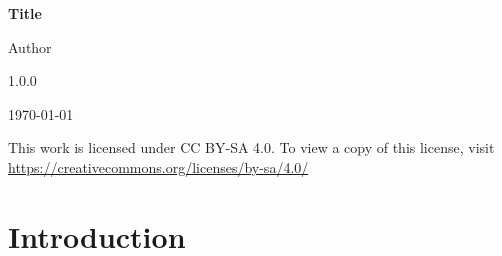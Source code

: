 \documentclass[12pt]{article}
\newcommand{\Title}{Title}
\newcommand{\Author}{Author}
\newcommand{\Version}{1.0.0}
\newcommand{\License}{This work is licensed under CC BY-SA 4.0. To view a copy of this license, visit \url{https://creativecommons.org/licenses/by-sa/4.0/}}
\begin{document}
\begin{titlepage}
    \centering
    \vspace*{2cm}

    {\Huge\bfseries \Title\par}
    \vspace{1.5cm}

    {\Large \Author\par}
    \vfill

    {\large \Version\par}
    {\large \today\par}
    \vspace{1cm}

    {\small \License\par}
\end{titlepage}

\tableofcontents
\newpage

\section{Introduction}

\newpage
\printbibliography
\end{document}

